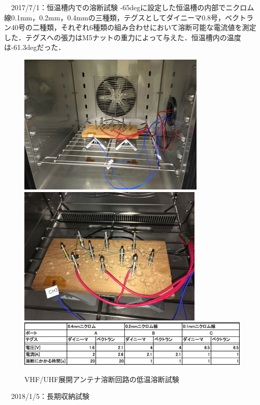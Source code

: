 \noindent　2017/7/1：恒温槽内での溶断試験
-65degに設定した恒温槽の内部でニクロム線0.1mm，0.2mm，0.4mmの三種類，テグスとしてダイニーマ0.8号，ベクトラン40号の二種類，それぞれ6種類の組み合わせにおいて溶断可能な電流値を測定した．テグスへの張力はM5ナットの重力によって与えた．恒温槽内の温度は-61.3degだった．
\begin{figure}[H]
	\centering
	\includegraphics[scale=1]{03/fig/3-8-11.jpg}
	\includegraphics[scale=1]{03/fig/3-8-12.jpg}
		\includegraphics[scale=1]{03/fig/3-8-13.jpg}
	\caption{VHF/UHF展開アンテナ溶断回路の低温溶断試験}
	\label{fig3-8-13}
\end{figure}

\noindent　2018/1/5：長期収納試験

